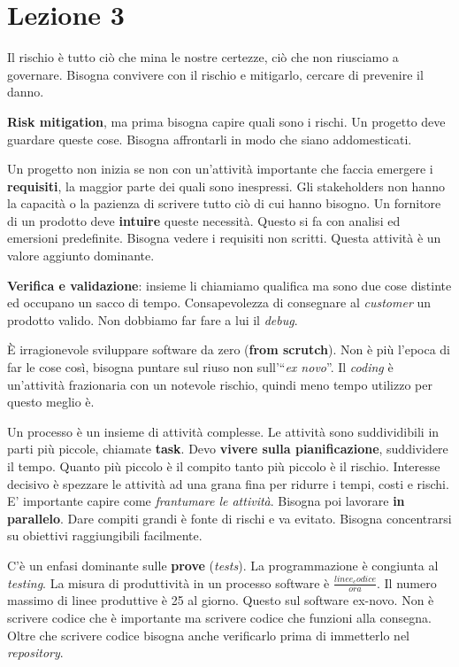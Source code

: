 



\section{Lezione 3}

Il rischio è tutto ciò che mina le nostre certezze, ciò che non riusciamo a governare. Bisogna convivere con il rischio e mitigarlo, cercare di prevenire il danno.

\textbf{Risk mitigation}, ma prima bisogna capire quali sono i rischi. Un progetto deve guardare queste cose. Bisogna affrontarli in modo che siano addomesticati.

Un progetto non inizia se non con un'attività importante che faccia emergere i \textbf{requisiti}, la maggior parte dei quali sono inespressi. Gli stakeholders non hanno la capacità o la pazienza di scrivere tutto ciò di cui hanno bisogno. Un fornitore di un prodotto deve \textbf{intuire} queste necessità. Questo si fa con analisi ed emersioni predefinite. Bisogna vedere i requisiti non scritti. Questa attività è un valore aggiunto dominante.

\textbf{Verifica e validazione}: insieme li chiamiamo qualifica ma sono due cose distinte ed occupano un sacco di tempo. Consapevolezza di consegnare al \textit{customer} un prodotto valido. Non dobbiamo far fare a lui il \textit{debug}.

È irragionevole sviluppare software da zero (\textbf{from scrutch}). Non è più l'epoca di far le cose così, bisogna puntare sul riuso non sull'``\textit{ex novo}''. Il \textit{coding} è un'attività frazionaria con un notevole rischio, quindi meno tempo utilizzo per questo meglio è.

Un processo è un insieme di attività complesse. Le attività sono suddividibili in parti più piccole, chiamate \textbf{task}. Devo \textbf{vivere sulla pianificazione}, suddividere il tempo. Quanto più piccolo è il compito tanto più piccolo è il rischio. Interesse decisivo è spezzare le attività ad una grana fina per ridurre i tempi, costi e rischi. E' importante capire come \textit{frantumare le attività}. Bisogna poi lavorare \textbf{in parallelo}. Dare compiti grandi è fonte di rischi e va evitato. Bisogna concentrarsi su obiettivi raggiungibili facilmente.

C'è un enfasi dominante sulle \textbf{prove} (\textit{tests}). La programmazione è congiunta al \textit{testing}. La misura di produttività in un processo software è $\frac{linee_codice}{ora}$. Il numero massimo di linee produttive è 25 al giorno. Questo sul software ex-novo. Non è scrivere codice che è importante ma scrivere codice che funzioni alla consegna. Oltre che scrivere codice bisogna anche verificarlo prima di immetterlo nel \textit{repository}.

